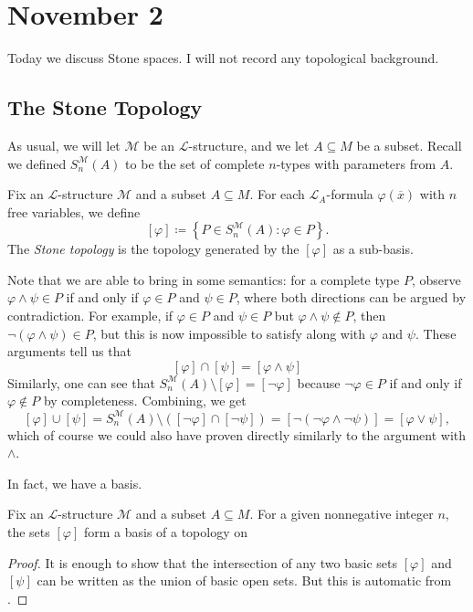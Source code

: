 \documentclass[../notes.tex]{subfiles}
\begin{document}
\section{November 2}

Today we discuss Stone spaces. I will not record any topological background.

\subsection{The Stone Topology}
As usual, we will let $\mathcal M$ be an $\mathcal L$-structure, and we let $A\subseteq M$ be a subset. Recall we defined $S_n^{\mathcal M}(A)$ to be the set of complete $n$-types with parameters from $A$.
\begin{definition}
	Fix an $\mathcal L$-structure $\mathcal M$ and a subset $A\subseteq M$. For each $\mathcal L_A$-formula $\varphi(\overline x)$ with $n$ free variables, we define
	\[[\varphi]\coloneqq\left\{P\in S_n^{\mathcal M}(A):\varphi\in P\right\}.\]
	The \textit{Stone topology} is the topology generated by the $[\varphi]$ as a sub-basis.
\end{definition}
\begin{remark} \label{rem:conjunct-is-intersect}
	Note that we are able to bring in some semantics: for a complete type $P$, observe $\varphi\land\psi\in P$ if and only if $\varphi\in P$ and $\psi\in P$, where both directions can be argued by contradiction. For example, if $\varphi\in P$ and $\psi\in P$ but $\varphi\land\psi\notin P$, then $\lnot(\varphi\land\psi)\in P$, but this is now impossible to satisfy along with $\varphi$ and $\psi$. These arguments tell us that
	\[[\varphi]\cap[\psi]=[\varphi\land\psi]\]
	Similarly, one can see that $S_n^{\mathcal M}(A)\setminus[\varphi]=[\lnot\varphi]$ because $\lnot\varphi\in P$ if and only if $\varphi\notin P$ by completeness. Combining, we get
	\[[\varphi]\cup[\psi]=S_n^{\mathcal M}(A)\setminus([\lnot\varphi]\cap[\lnot\psi])=[\lnot(\lnot\varphi\land\lnot\psi)]=[\varphi\lor\psi],\]
	which of course we could also have proven directly similarly to the argument with $\land$.
\end{remark}
In fact, we have a basis.
\begin{lemma}
	Fix an $\mathcal L$-structure $\mathcal M$ and a subset $A\subseteq M$. For a given nonnegative integer $n$, the sets $[\varphi]$ form a basis of a topology on 
\end{lemma}
\begin{proof}
	It is enough to show that the intersection of any two basic sets $[\varphi]$ and $[\psi]$ can be written as the union of basic open sets. But this is automatic from .
\end{proof}
\end{document}
